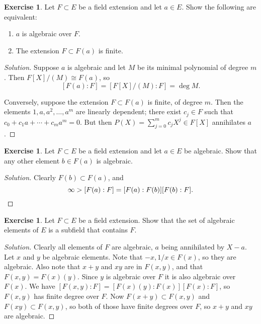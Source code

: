 \documentclass[11pt]{amsart}
\theoremstyle{definition}
\newtheorem{e}[theo]{Exercise}
\newenvironment{s}{\begin{proof}[Solution]}{\end{proof}}
\begin{document}
\begin{e}
Let $F \subset E$ be a field extension and let $a \in E$.
Show the following are equivalent:
\begin{enumerate}
\item
$a$ is algebraic over $F$.

\item
The extension $F \subset F(a)$ is finite.
\end{enumerate}
\end{e}

\begin{s}
Suppose $a$ is algebraic and let $M$ be its minimal polynomial of degree $m$.
Then $F[X]/(M) \cong F(a)$, so
\[
[F(a) : F] = [F[X]/(M) : F] = \deg M.
\]

Conversely, suppose the extension $F \subset F(a)$ is finite, of degree $m$.
Then the elements $1, a, a^2, \ldots, a^m$ are linearly dependent; there exist $c_j \in F$ such that $c_0 + c_1 a + \cdots + c_m a^m = 0$.
But then $P(X) = \sum_{j=0}^m c_j X^j \in F[X]$ annihilates $a$.
\end{s}


\begin{e}
Let $F \subset E$ be a field extension and let $a \in E$ be algebraic.
Show that any other element $b \in F(a)$ is algebraic.
\end{e}

\begin{s}
Clearly $F(b) \subset F(a)$, and
\[
\infty > [F(a) : F]
= [F(a) : F(b)] [F(b) : F].
\qedhere
\]
\end{s}


\begin{e}
Let $F \subset E$ be a field extension.
Show that the set of algebraic elements of $E$ is a subfield that contains $F$.
\end{e}

\begin{s}
Clearly all elements of $F$ are algebraic, $a$ being annihilated by $X - a$.
Let $x$ and $y$ be algebraic elements.
Note that $-x, 1/x \in F(x)$, so they are algebraic.
Also note that $x + y$ and $xy$ are in $F(x,y)$, and that $F(x,y) = F(x)(y)$.
Since $y$ is algebraic over $F$ it is also algebraic over $F(x)$.
We have $[F(x,y):F] = [F(x)(y) : F(x)] [F(x) : F]$, so $F(x,y)$ has finite degree over $F$.
Now $F(x+y) \subset F(x,y)$ and $F(xy) \subset F(x,y)$, so both of those have finite degrees over $F$, so $x+y$ and $xy$ are algebraic.
\end{s}
\end{document}
